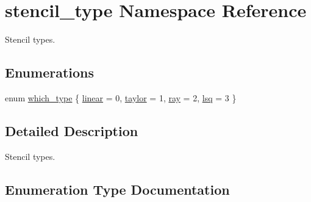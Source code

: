 \hypertarget{namespacestencil__type}{}\section{stencil\+\_\+type Namespace Reference}
\label{namespacestencil__type}


Stencil types.  


\subsection*{Enumerations}
\begin{DoxyCompactItemize}
\item 
enum \hyperlink{namespacestencil__type_a1ffed19935b7289b50e8dcc017ee99c8}{which\+\_\+type} \{ \hyperlink{namespacestencil__type_a1ffed19935b7289b50e8dcc017ee99c8ad26562f23a3212bb1aaf532932f501dd}{linear} = 0, 
\hyperlink{namespacestencil__type_a1ffed19935b7289b50e8dcc017ee99c8a525dea9e3766ba38f13bb09014fd3555}{taylor} = 1, 
\hyperlink{namespacestencil__type_a1ffed19935b7289b50e8dcc017ee99c8af7c4595e54e5d99d50f088e03db2360c}{ray} = 2, 
\hyperlink{namespacestencil__type_a1ffed19935b7289b50e8dcc017ee99c8ad71056491f974feffd7139219ab62d25}{lsq} = 3
 \}
\end{DoxyCompactItemize}


\subsection{Detailed Description}
Stencil types. 

\subsection{Enumeration Type Documentation}
